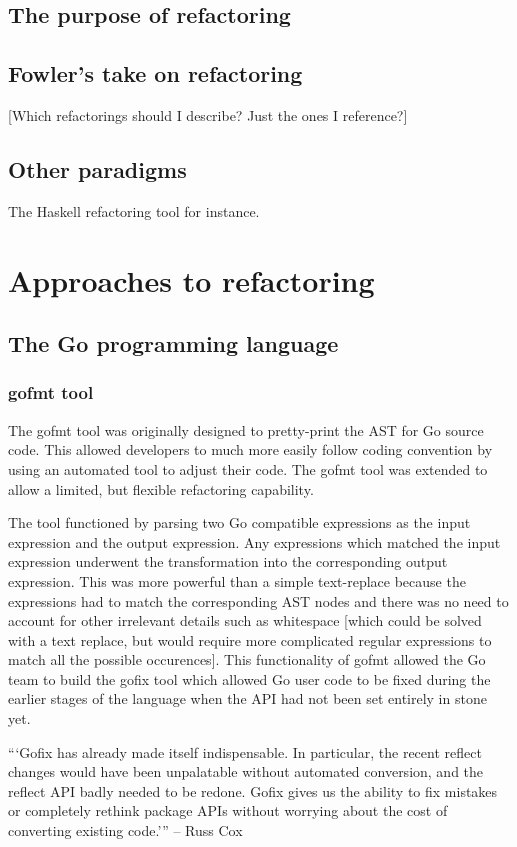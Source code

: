 \subsection{The purpose of refactoring}

\subsection{Fowler's take on refactoring}
[Which refactorings should I describe? Just the ones I reference?]

\subsection{Other paradigms}
The Haskell refactoring tool for instance.


\section{Approaches to refactoring}
\subsection{The Go programming language}
\subsubsection{gofmt tool}
The gofmt tool was originally designed to pretty-print the AST for Go source code. This allowed developers to much more easily follow coding convention by using an automated tool to adjust their code. The gofmt tool was extended to allow a limited, but flexible refactoring capability. 

The tool functioned by parsing two Go compatible expressions as the input expression and the output expression. Any expressions which matched the input expression underwent the transformation into the corresponding output expression. This was more powerful than a simple text-replace because the expressions had to match the corresponding AST nodes and there was no need to account for other irrelevant details such as whitespace [which could be solved with a text replace, but would require more complicated regular expressions to match all the possible occurences]. This functionality of gofmt allowed the Go team to build the gofix tool which allowed Go user code to be fixed during the earlier stages of the language when the API had not been set entirely in stone yet.

```Gofix has already made itself indispensable. In particular, the recent reflect changes would have been unpalatable without automated conversion, and the reflect API badly needed to be redone. Gofix gives us the ability to fix mistakes or completely rethink package APIs without worrying about the cost of converting existing code.''' -- Russ Cox

